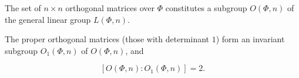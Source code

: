 The set of $n \times n$ orthogonal matrices over $\Phi$ constitutes a subgroup $O(\Phi, n)$ of the general linear group $L(\Phi, n)$.

The proper orthogonal matrices (those with determinant $1$) form an invariant subgroup $O_1(\Phi, n)$ of $O(\Phi, n)$, and

$$[O(\Phi, n) : O_1(\Phi, n)] = 2.$$
